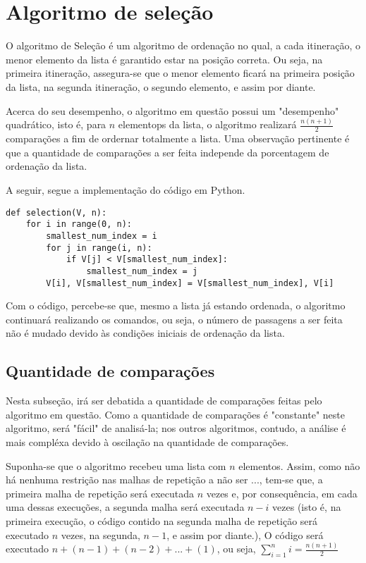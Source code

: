 \section{Algoritmo de seleção}
O algoritmo de Seleção é um algoritmo de ordenação no qual, a cada itineração, o menor elemento da lista é garantido estar na posição correta. Ou seja, na primeira itineração, assegura-se que o menor elemento ficará na primeira posição da lista, na segunda itineração, o segundo elemento, e assim por diante. 

Acerca do seu desempenho, o algoritmo em questão possui um "desempenho" quadrático, isto é, para $n$ elementops da lista, o algoritmo realizará $\frac{n(n+1)}{2}$ comparações a fim de ordernar totalmente a lista. Uma observação pertinente é que a quantidade de comparações a ser feita independe da porcentagem de ordenação da lista.

A seguir, segue a implementação do código em Python.

\begin{lstlisting}
def selection(V, n):
    for i in range(0, n):
        smallest_num_index = i
        for j in range(i, n):
            if V[j] < V[smallest_num_index]:
                smallest_num_index = j
        V[i], V[smallest_num_index] = V[smallest_num_index], V[i]

\end{lstlisting}

Com o código, percebe-se que, mesmo a lista já estando ordenada, o algoritmo continuará realizando os comandos, ou seja, o número de passagens a ser feita não é mudado devido às condições iniciais de ordenação da lista.
\subsection*{Quantidade de comparações}
Nesta subseção, irá ser debatida a quantidade de comparações feitas pelo algoritmo em questão. Como a quantidade de comparações é "constante" neste algoritmo, será "fácil" de analisá-la; nos outros algoritmos, contudo, a análise é mais compléxa devido à oscilação na quantidade de comparações.

Suponha-se que o algoritmo recebeu uma lista com $n$ elementos. Assim, como não há nenhuma restrição nas malhas de repetição a não ser ..., tem-se que, a primeira malha de repetição será executada $n$ vezes e, por consequência, em cada uma dessas execuções, a segunda malha será executada $n-i$ vezes (isto é, na primeira execução, o código contido na segunda malha de repetição será executado $n$ vezes, na segunda, $n-1$, e assim por diante.), O código será executado $n+(n-1)+(n-2)+...+(1)$, ou seja, $\sum_{i=1}^n i = \frac{n(n+1)}{2}$
